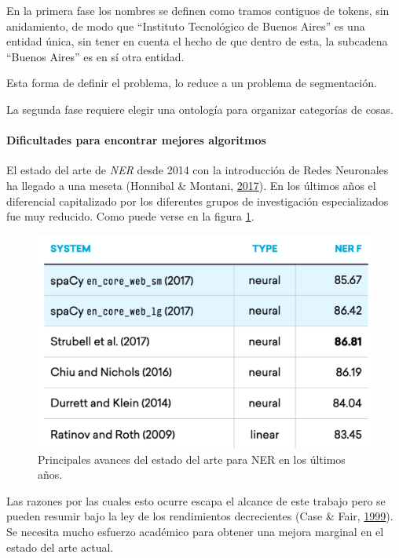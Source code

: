 \documentclass[12pt,a4paper,]{scrartcl}
\let\oldparagraph\paragraph
\renewcommand{\paragraph}[1]{\oldparagraph{#1}\mbox{}}
\begin{document}
En la primera fase los nombres se definen como tramos contiguos de tokens, sin anidamiento, de modo que \enquote{Instituto Tecnológico de Buenos Aires} es una entidad única, sin tener en cuenta el hecho de que dentro de esta, la subcadena \enquote{Buenos Aires} es en sí otra entidad.

Esta forma de definir el problema, lo reduce a un problema de segmentación.

La segunda fase requiere elegir una ontología para organizar categorías de cosas.

\hypertarget{dificultades-para-encontrar-mejores-algoritmos}{%
\paragraph{Dificultades para encontrar mejores algoritmos}\label{dificultades-para-encontrar-mejores-algoritmos}}

El estado del arte de \emph{NER} desde 2014 con la introducción de Redes Neuronales ha llegado a una meseta (Honnibal \& Montani, \protect\hyperlink{ref-honnibal_NER}{2017}). En los últimos años el diferencial capitalizado por los diferentes grupos de investigación especializados fue muy reducido. Como puede verse en la figura \ref{fig:spacy-algos}.

\begin{figure}[H]

{\centering \includegraphics{assets/state-of-the-art_difficulties.pdf} 

}

\caption{Principales avances del estado del arte para NER en los últimos años.}\label{fig:spacy-algos}
\end{figure}

Las razones por las cuales esto ocurre escapa el alcance de este trabajo pero se pueden resumir bajo la ley de los rendimientos decrecientes (Case \& Fair, \protect\hyperlink{ref-lawOfDiminishingReturns}{1999}). Se necesita mucho esfuerzo académico para obtener una mejora marginal en el estado del arte actual.
\end{document}
